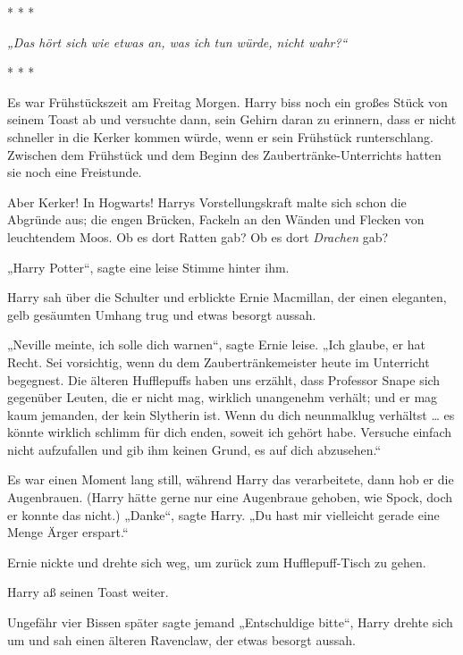 

\hypertarget{hackordnung}{%

* * *

\hfill\break \emph{„Das hört sich wie etwas an, was ich tun würde, nicht wahr?“}

* * *

Es war Frühstückszeit am Freitag Morgen. Harry biss noch ein großes Stück von seinem Toast ab und versuchte dann, sein Gehirn daran zu erinnern, dass er nicht schneller in die Kerker kommen würde, wenn er sein Frühstück runterschlang. Zwischen dem Frühstück und dem Beginn des Zaubertränke-Unterrichts hatten sie noch eine Freistunde.

Aber Kerker! In Hogwarts! Harrys Vorstellungskraft malte sich schon die Abgründe aus; die engen Brücken, Fackeln an den Wänden und Flecken von leuchtendem Moos. Ob es dort Ratten gab? Ob es dort \emph{Drachen} gab?

„Harry Potter“, sagte eine leise Stimme hinter ihm.

Harry sah über die Schulter und erblickte Ernie Macmillan, der einen eleganten, gelb gesäumten Umhang trug und etwas besorgt aussah.

„Neville meinte, ich solle dich warnen“, sagte Ernie leise. „Ich glaube, er hat Recht. Sei vorsichtig, wenn du dem Zaubertränkemeister heute im Unterricht begegnest. Die älteren Hufflepuffs haben uns erzählt, dass Professor Snape sich gegenüber Leuten, die er nicht mag, wirklich unangenehm verhält; und er mag kaum jemanden, der kein Slytherin ist. Wenn du dich neunmalklug verhältst … es könnte wirklich schlimm für dich enden, soweit ich gehört habe. Versuche einfach nicht aufzufallen und gib ihm keinen Grund, es auf dich abzusehen.“

Es war einen Moment lang still, während Harry das verarbeitete, dann hob er die Augenbrauen. (Harry hätte gerne nur eine Augenbraue gehoben, wie Spock, doch er konnte das nicht.) „Danke“, sagte Harry. „Du hast mir vielleicht gerade eine Menge Ärger erspart.“

Ernie nickte und drehte sich weg, um zurück zum Hufflepuff-Tisch zu gehen.

Harry aß seinen Toast weiter.

Ungefähr vier Bissen später sagte jemand „Entschuldige bitte“, Harry drehte sich um und sah einen älteren Ravenclaw, der etwas besorgt aussah.

}
